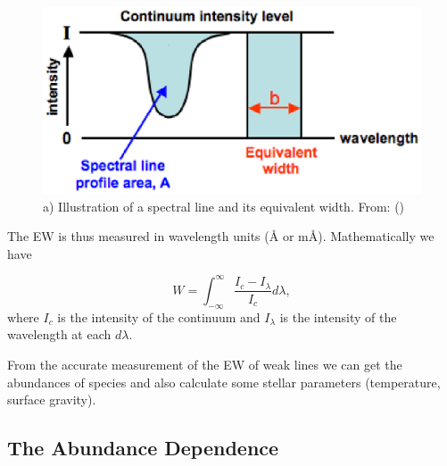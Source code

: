 \documentclass[dvips,12pt,a4paper]{report}
\begin{document}
{\begin{figure}[h]
\centering
\includegraphics[height=5 cm]{pics/equivalent_width}
\caption{a) Illustration of a spectral line and its equivalent width. From: ()}
\label{ew}
\end{figure}

The EW is thus measured in wavelength units (\AA{}  or m\AA). Mathematically we have

\begin{equation}
 W=\int_{-\infty}^{\infty} \frac{I_c-I_\lambda}{I_c}d\lambda,
\end{equation}
where $I_c$ is the intensity of the continuum and $I_\lambda$ is the intensity of the wavelength at each $d\lambda$.

From the accurate measurement of the EW of weak lines we can get the abundances of species and also calculate some stellar parameters (temperature, surface gravity).

\subsection{The Abundance Dependence}
\label{abdep}

}
\end{document}
